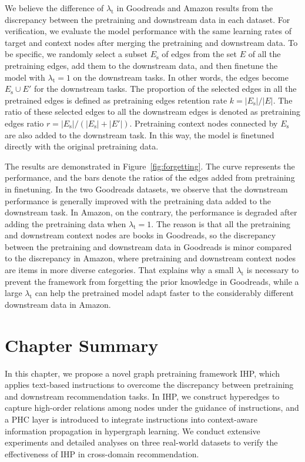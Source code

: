 We believe the difference of $\lambda_\text{t}$ in Goodreads and Amazon results from the discrepancy between the pretraining and downstream data in each dataset. 
For verification, we evaluate the model performance with the same learning rates of target and context nodes after merging the pretraining and downstream data.
To be specific, we randomly select a subset $E_\text{s}$ of edges from the set $E$ of all the pretraining edges, add them to the downstream data, and then finetune the model with $\lambda_\text{t}=1$ on the downstream tasks. 
In other words, the edges become $E_\text{s}\cup E'$ for the downstream tasks. 
The proportion of the selected edges in all the pretrained edges is defined as pretraining edges retention rate $k=|E_\text{s}|/|E|$. 
The ratio of these selected edges to all the downstream edges is denoted as pretraining edges ratio $r=|E_\text{s}|/(|E_\text{s}|+|E'|)$. 
Pretraining context nodes connected by $E_\text{s}$ are also added to the downstream task. 
In this way, the model is finetuned directly with the original pretraining data.

The results are demonstrated in Figure~\ref{fig:forgetting}. The curve represents the performance, and the bars denote the ratios of the edges added from pretraining in finetuning.
In the two Goodreads datasets, we observe that the downstream performance is generally improved with the pretraining data added to the downstream task. 
In Amazon, on the contrary, the performance is degraded after adding the pretraining data when $\lambda_\text{t}=1$. 
The reason is that all the pretraining and downstream context nodes are books in Goodreads, so the discrepancy between the pretraining and downstream data in Goodreads is minor compared to the discrepancy in Amazon, where pretraining and downstream context nodes are items in more diverse categories. 
That explains why a small $\lambda_\text{t}$ is necessary to prevent the framework from forgetting the prior knowledge in Goodreads, while a large $\lambda_\text{t}$ can help the pretrained model adapt faster to the considerably different downstream data in Amazon.

\section{Chapter Summary}
In this chapter, we propose a novel graph pretraining framework IHP, which applies text-based instructions to overcome the discrepancy between pretraining and downstream recommendation tasks.
In IHP, we construct hyperedges to capture high-order relations among nodes under the guidance of instructions, and a PHC layer is introduced to integrate instructions into context-aware information propagation in hypergraph learning. 
We conduct extensive experiments and detailed analyses on three real-world datasets to verify the effectiveness of IHP in cross-domain recommendation. 


